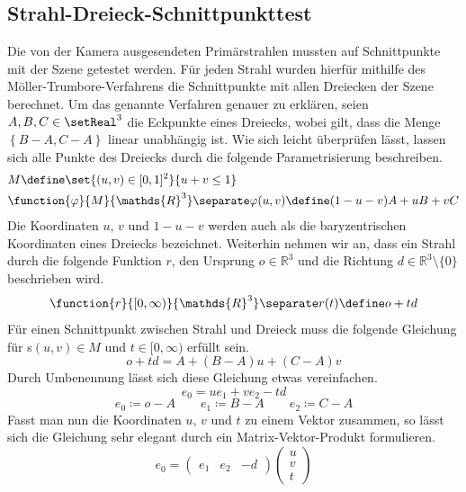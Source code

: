 \documentclass[crop=false]{standalone}
\begin{document}
    \subsection{Strahl-Dreieck-Schnittpunkttest} %
    \label{sub:strahl_dreieck_schnittpunkttest}
      Die von der Kamera ausgesendeten Primärstrahlen mussten auf Schnittpunkte mit der Szene getestet werden.
      Für jeden Strahl wurden hierfür mithilfe des Möller-Trumbore-Verfahrens die Schnittpunkte mit allen Dreiecken der Szene berechnet.
      Um das genannte Verfahren genauer zu erklären, seien $A,B,C\in \setReal^3$ die Eckpunkte eines Dreiecks, wobei gilt, dass die Menge $\left\{ B-A,C-A \right\}$ linear unabhängig ist.
      Wie sich leicht überprüfen lässt, lassen sich alle Punkte des Dreiecks durch die folgende Parametrisierung beschreiben.
      \begin{align*}
        &M \define \set{ (u,v)\in [0,1]^2 }{ u+v \leq 1 } \\
        &\function{\varphi}{M}{\mathds{R}^3}
        \separate
        \varphi(u,v)\define (1-u-v)A + uB + vC
      \end{align*}
      Die Koordinaten $u$, $v$ und $1-u-v$ werden auch als die baryzentrischen Koordinaten eines Dreiecks bezeichnet.
      Weiterhin nehmen wir an, dass ein Strahl durch die folgende Funktion $r$, den Ursprung $o\in\mathds{R}^3$ und die Richtung $d\in\mathds{R}^3\setminus\{0\}$ beschrieben wird.
      \[
        \function{r}{[0,\infty)}{\mathds{R}^3}
        \separate
        r(t) \define o + td
      \]
      Für einen Schnittpunkt zwischen Strahl und Dreieck muss die folgende Gleichung für s$(u,v)\in M$ und $t\in[0,\infty)$ erfüllt sein.
      \[
        o + td = A + (B-A)u + (C-A)v
      \]
      Durch Umbenennung lässt sich diese Gleichung etwas vereinfachen.
      \[
        e_0 = ue_1 + ve_2 - td
      \]
      \[
        e_0 \coloneqq o - A
        \qquad
        e_1 \coloneqq B-A
        \qquad
        e_2 \coloneqq C-A
      \]
      Fasst man nun die Koordinaten $u$, $v$ und $t$ zu einem Vektor zusammen, so lässt sich die Gleichung sehr elegant durch ein Matrix-Vektor-Produkt formulieren.
      \[
        e_0 =
        \begin{pmatrix}
          e_1 &
          e_2 &
          -d
        \end{pmatrix}
        \begin{pmatrix}
          u \\
          v \\
          t
        \end{pmatrix}
      \]
\end{document}

